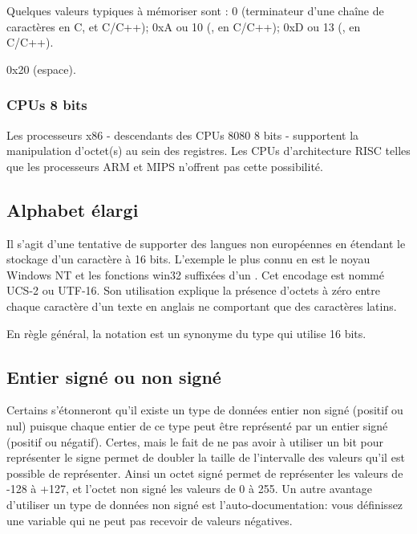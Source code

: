 Quelques valeurs typiques à mémoriser sont :
0 (terminateur d'une chaîne de caractères en C,  et C/C++);
0xA ou 10 (,  en C/C++);
0xD ou 13 (,  en C/C++).

0x20 (espace).

\subsubsection{CPUs 8 bits}

Les processeurs x86 - descendants des CPUs 8080 8 bits - supportent la manipulation d'octet(s) au sein des registres.
Les CPUs d'architecture RISC telles que les processeurs ARM et MIPS n'offrent pas cette possibilité.

\subsection{Alphabet élargi}

Il s'agit d'une tentative de supporter des langues non européennes en étendant le stockage d'un caractère à 16 bits.
L'exemple le plus connu en est le noyau Windows NT et les fonctions win32 suffixées d'un .
Cet encodage est nommé UCS-2 ou UTF-16.
Son utilisation explique la présence d'octets à zéro entre chaque caractère d'un texte en anglais ne comportant que des caractères latins.

En règle général, la notation  est un synonyme du type  qui utilise 16 bits.

\subsection{Entier signé ou non signé}

Certains s'étonneront qu'il existe un type de données entier non signé (positif ou nul) puisque chaque entier de ce type peut être représenté par un entier signé (positif ou négatif).
Certes, mais le fait de ne pas avoir à utiliser un bit pour représenter le signe permet de doubler la taille de l'intervalle des valeurs qu'il est possible de représenter.
Ainsi un octet signé permet de représenter les valeurs de -128 à +127, et l'octet non signé les valeurs de 0 à 255.
Un autre avantage d'utiliser un type de données non signé est l'auto-documentation:
vous définissez une variable qui ne peut pas recevoir de valeurs négatives.

